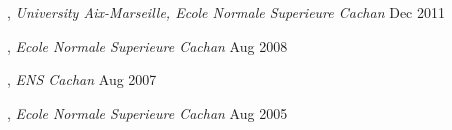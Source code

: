 
, \textit{University Aix-Marseille, Ecole Normale Superieure Cachan}	\hfill Dec 2011

, \textit{Ecole Normale Superieure Cachan}	\hfill Aug 2008

, \textit{ENS Cachan} \hfill	Aug 2007

, \textit{Ecole Normale Superieure Cachan} \hfill	Aug 2005

